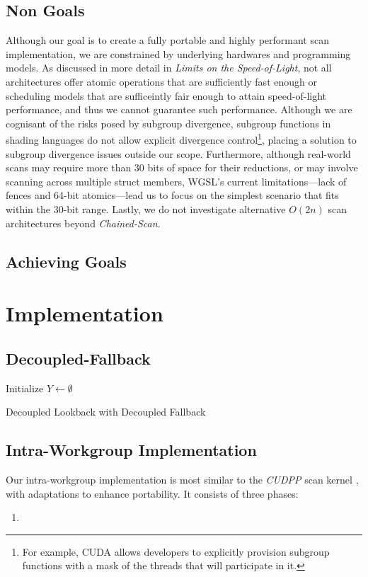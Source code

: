 \documentclass[sigconf]{acmart}
\begin{document}
\subsection{Non Goals}
Although our goal is to create a fully portable and highly performant scan implementation, we are constrained by underlying hardwares and programming models. As discussed in more detail in \emph{Limits on the Speed-of-Light}, not all architectures offer atomic operations that are sufficiently fast enough or scheduling models that are sufficeintly fair enough to attain speed-of-light performance, and thus we cannot guarantee such performance. Although we are cognisant of the risks posed by subgroup divergence, subgroup functions in shading languages do not allow explicit divergence control\footnote{For example, CUDA allows developers to explicitly provision subgroup functions with a mask of the threads that will participate in it.}, placing a solution to subgroup divergence issues outside our scope. Furthermore, although real-world scans may require more than 30 bits of space for their reductions, or may involve scanning across multiple struct members, WGSL’s current limitations---lack of fences and 64-bit atomics---lead us to focus on the simplest scenario that fits within the 30-bit range. Lastly, we do not investigate alternative $O(2n)$ scan architectures beyond \emph{Chained-Scan}.

\subsection{Achieving Goals}

\section{Implementation}

\subsection{Decoupled-Fallback}

\begin{algorithm}[htbp]
  \SetAlgoLined
  Initialize $Y \leftarrow \emptyset$\;
  \;
  \caption{Decoupled Lookback with Decoupled Fallback}
  \label{alg:example}
\end{algorithm}

\subsection{Intra-Workgroup Implementation}
Our intra-workgroup implementation is most similar to the \emph{CUDPP} scan kernel \cite{}, with adaptations to enhance portability. It consists of three phases:
\begin{enumerate}
  \item
\end{enumerate}
\end{document}
